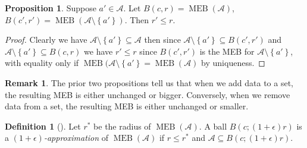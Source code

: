 \documentclass[11pt,twoside]{report}
\newcommand{\A}{\mathcal{A}} %
\DeclareMathOperator{\MEB}{MEB}
\theoremstyle{definition}
\newtheorem{definition}{Definition}
\newtheorem{proposition}{Proposition}
\newtheorem*{remark}{Remark}
\numberwithin{theorem}{section}
\numberwithin{definition}{section}
\numberwithin{lemma}{section}
\numberwithin{proposition}{section}
\numberwithin{equation}{section}
\numberwithin{figure}{section}
\begin{document}
\begin{proposition}\label{removing data}
Suppose $a'\in\A$. Let $B(c,r)=\MEB(\A)$, $B(c',r')=\MEB(\A\setminus\left\{a'\right\})$. Then $r'\leq r$.
\end{proposition}
\begin{proof}
Clearly we have $\A\setminus\left\{a'\right\}\subseteq\A$ then since $\A\setminus\left\{a'\right\}\subseteq B(c',r')$ and $\A\setminus\left\{a'\right\}\subseteq B(c,r)$ we have $r'\leq r$ since $B(c',r')$ is the MEB for $\A\setminus\left\{a'\right\}$, with equality only if $\MEB(\A\setminus\left\{a'\right\} = \MEB(\A)$ by uniqueness.
\end{proof}
\begin{remark}
The prior two propositions tell us that when we add data to a set, the resulting MEB is either unchanged or bigger. Conversely, when we remove data from a set, the resulting MEB is either unchanged or smaller.
\end{remark}

\begin{definition}[{{\cite[page 2]{core-sets}}}]
Let $r^*$ be the radius of $\MEB(\A)$. A ball $B(c;(1+\epsilon)r)$ is a \textit{$(1+\epsilon)$-approximation} of $\MEB(\A)$ if $r\leq r^*$ and $\mathcal{A}\subseteq B(c;(1+\epsilon)r)$.
\end{definition}
\end{document}
